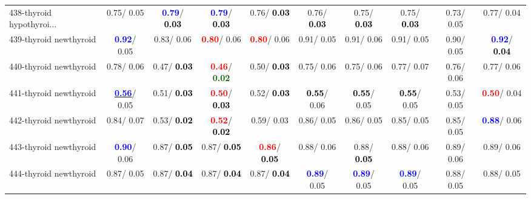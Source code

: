 \begin{table}[h]
\begin{center}
{\begin{tabular}{lc|c|c|c|c|c|c|c|c}
438-thyroid hypothyroi... &   0.75/  0.05 & \textcolor{blue}{\textbf{  0.79}}/\textcolor{black}{\textbf{  0.03}} & \textcolor{blue}{\textbf{  0.79}}/\textcolor{black}{\textbf{  0.03}} &   0.76/\textcolor{black}{\textbf{  0.03}} &   0.76/\textcolor{black}{\textbf{  0.03}} &   0.75/\textcolor{black}{\textbf{  0.03}} &   0.75/\textcolor{black}{\textbf{  0.03}} &   0.73/  0.05 &   0.77/  0.04 \\
439-thyroid newthyroid & \textcolor{blue}{\textbf{  0.92}}/  0.05 &   0.83/  0.06 & \textcolor{red}{\textbf{  0.80}}/  0.06 & \textcolor{red}{\textbf{  0.80}}/  0.06 &   0.91/  0.05 &   0.91/  0.06 &   0.91/  0.05 &   0.90/  0.05 & \textcolor{blue}{\textbf{  0.92}}/\textcolor{black}{\textbf{  0.04}} \\
440-thyroid newthyroid &   0.78/  0.06 &   0.47/\textcolor{black}{\textbf{  0.03}} & \textcolor{red}{\textbf{  0.46}}/\textcolor{darkgreen}{\textbf{  0.02}} &   0.50/\textcolor{black}{\textbf{  0.03}} &   0.75/  0.06 &   0.75/  0.06 &   0.77/  0.07 &   0.76/  0.06 &   0.77/  0.06 \\
441-thyroid newthyroid & \underline{\textcolor{blue}{\textbf{  0.56}}}/  0.05 &   0.51/\textcolor{black}{\textbf{  0.03}} & \textcolor{red}{\textbf{  0.50}}/\textcolor{black}{\textbf{  0.03}} &   0.52/\textcolor{black}{\textbf{  0.03}} & \textcolor{black}{\textbf{  0.55}}/  0.06 & \textcolor{black}{\textbf{  0.55}}/  0.05 & \textcolor{black}{\textbf{  0.55}}/  0.05 &   0.53/  0.05 & \textcolor{red}{\textbf{  0.50}}/  0.04 \\
442-thyroid newthyroid &   0.84/  0.07 &   0.53/\textcolor{black}{\textbf{  0.02}} & \textcolor{red}{\textbf{  0.52}}/\textcolor{black}{\textbf{  0.02}} &   0.59/  0.03 &   0.86/  0.05 &   0.86/  0.05 &   0.85/  0.05 &   0.85/  0.05 & \textcolor{blue}{\textbf{  0.88}}/  0.06 \\
443-thyroid newthyroid & \textcolor{blue}{\textbf{  0.90}}/  0.06 &   0.87/\textcolor{black}{\textbf{  0.05}} &   0.87/\textcolor{black}{\textbf{  0.05}} & \textcolor{red}{\textbf{  0.86}}/\textcolor{black}{\textbf{  0.05}} &   0.88/  0.06 &   0.88/\textcolor{black}{\textbf{  0.05}} &   0.88/  0.06 &   0.89/  0.06 &   0.89/  0.06 \\
444-thyroid newthyroid &   0.87/  0.05 &   0.87/\textcolor{black}{\textbf{  0.04}} &   0.87/\textcolor{black}{\textbf{  0.04}} &   0.87/\textcolor{black}{\textbf{  0.04}} & \textcolor{blue}{\textbf{  0.89}}/  0.05 & \textcolor{blue}{\textbf{  0.89}}/  0.05 & \textcolor{blue}{\textbf{  0.89}}/  0.05 &   0.88/  0.05 &   0.88/  0.05 \\ \hline

\end{tabular}}
\end{center}
\end{table}
